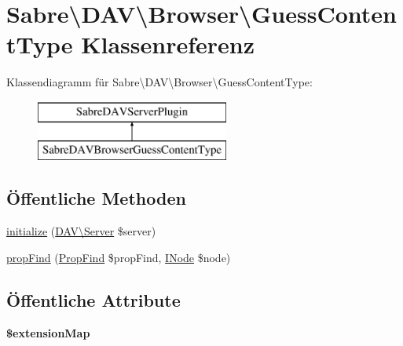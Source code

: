 \hypertarget{class_sabre_1_1_d_a_v_1_1_browser_1_1_guess_content_type}{}\section{Sabre\textbackslash{}D\+AV\textbackslash{}Browser\textbackslash{}Guess\+Content\+Type Klassenreferenz}
\label{class_sabre_1_1_d_a_v_1_1_browser_1_1_guess_content_type}
Klassendiagramm für Sabre\textbackslash{}D\+AV\textbackslash{}Browser\textbackslash{}Guess\+Content\+Type\+:\begin{figure}[H]
\begin{center}
\leavevmode
\includegraphics[height=2.000000cm]{class_sabre_1_1_d_a_v_1_1_browser_1_1_guess_content_type}
\end{center}
\end{figure}
\subsection*{Öffentliche Methoden}
\begin{DoxyCompactItemize}
\item 
\mbox{\hyperlink{class_sabre_1_1_d_a_v_1_1_browser_1_1_guess_content_type_a9e2afe74ab53f8a8ce4e4436b73cf345}{initialize}} (\mbox{\hyperlink{class_sabre_1_1_d_a_v_1_1_server}{D\+A\+V\textbackslash{}\+Server}} \$server)
\item 
\mbox{\hyperlink{class_sabre_1_1_d_a_v_1_1_browser_1_1_guess_content_type_a5b09b78a39fb500a3ba14a1a3d23ca74}{prop\+Find}} (\mbox{\hyperlink{class_sabre_1_1_d_a_v_1_1_prop_find}{Prop\+Find}} \$prop\+Find, \mbox{\hyperlink{interface_sabre_1_1_d_a_v_1_1_i_node}{I\+Node}} \$node)
\end{DoxyCompactItemize}
\subsection*{Öffentliche Attribute}
\begin{DoxyCompactItemize}
\item 
{\bfseries \$extension\+Map}
\end{DoxyCompactItemize}
